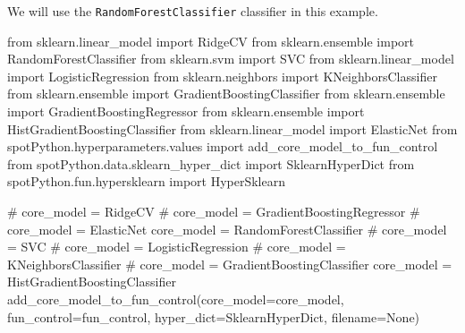 \documentclass[
  letterpaper,
  DIV=11,
  numbers=noendperiod]{scrreprt}
\newenvironment{Shaded}{\begin{snugshade}}{\end{snugshade}}
\newcommand{\CommentTok}[1]{\textcolor[rgb]{0.37,0.37,0.37}{#1}}
\newcommand{\ImportTok}[1]{\textcolor[rgb]{0.00,0.46,0.62}{#1}}
\newcommand{\NormalTok}[1]{\textcolor[rgb]{0.00,0.23,0.31}{#1}}
\newcommand{\OperatorTok}[1]{\textcolor[rgb]{0.37,0.37,0.37}{#1}}
\newcommand{\VariableTok}[1]{\textcolor[rgb]{0.07,0.07,0.07}{#1}}
\begin{document}
We will use the \texttt{RandomForestClassifier} classifier in this
example.

\begin{Shaded}
\begin{Highlighting}[]
\ImportTok{from}\NormalTok{ sklearn.linear\_model }\ImportTok{import}\NormalTok{ RidgeCV}
\ImportTok{from}\NormalTok{ sklearn.ensemble }\ImportTok{import}\NormalTok{ RandomForestClassifier}
\ImportTok{from}\NormalTok{ sklearn.svm }\ImportTok{import}\NormalTok{ SVC}
\ImportTok{from}\NormalTok{ sklearn.linear\_model }\ImportTok{import}\NormalTok{ LogisticRegression}
\ImportTok{from}\NormalTok{ sklearn.neighbors }\ImportTok{import}\NormalTok{ KNeighborsClassifier}
\ImportTok{from}\NormalTok{ sklearn.ensemble }\ImportTok{import}\NormalTok{ GradientBoostingClassifier}
\ImportTok{from}\NormalTok{ sklearn.ensemble }\ImportTok{import}\NormalTok{ GradientBoostingRegressor}
\ImportTok{from}\NormalTok{ sklearn.ensemble }\ImportTok{import}\NormalTok{ HistGradientBoostingClassifier}
\ImportTok{from}\NormalTok{ sklearn.linear\_model }\ImportTok{import}\NormalTok{ ElasticNet}
\ImportTok{from}\NormalTok{ spotPython.hyperparameters.values }\ImportTok{import}\NormalTok{ add\_core\_model\_to\_fun\_control}
\ImportTok{from}\NormalTok{ spotPython.data.sklearn\_hyper\_dict }\ImportTok{import}\NormalTok{ SklearnHyperDict}
\ImportTok{from}\NormalTok{ spotPython.fun.hypersklearn }\ImportTok{import}\NormalTok{ HyperSklearn}
\end{Highlighting}
\end{Shaded}

\begin{Shaded}
\begin{Highlighting}[]
\CommentTok{\# core\_model  = RidgeCV}
\CommentTok{\# core\_model = GradientBoostingRegressor}
\CommentTok{\# core\_model = ElasticNet}
\NormalTok{core\_model }\OperatorTok{=}\NormalTok{ RandomForestClassifier}
\CommentTok{\# core\_model = SVC}
\CommentTok{\# core\_model = LogisticRegression}
\CommentTok{\# core\_model = KNeighborsClassifier}
\CommentTok{\# core\_model = GradientBoostingClassifier}
\NormalTok{core\_model }\OperatorTok{=}\NormalTok{ HistGradientBoostingClassifier}
\NormalTok{add\_core\_model\_to\_fun\_control(core\_model}\OperatorTok{=}\NormalTok{core\_model,}
\NormalTok{                              fun\_control}\OperatorTok{=}\NormalTok{fun\_control,}
\NormalTok{                              hyper\_dict}\OperatorTok{=}\NormalTok{SklearnHyperDict,}
\NormalTok{                              filename}\OperatorTok{=}\VariableTok{None}\NormalTok{)}
\end{Highlighting}
\end{Shaded}
\end{document}
